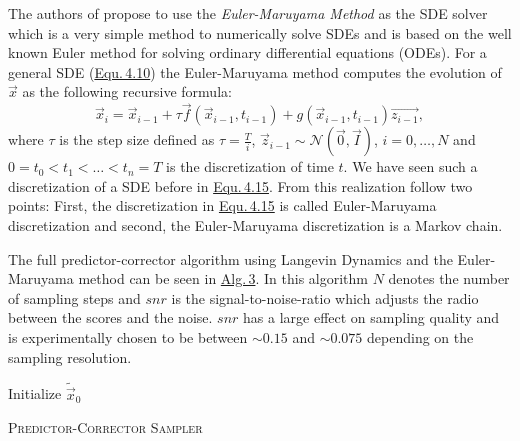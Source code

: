 The authors of \cite{score_3} propose to use the \textit{Euler-Maruyama Method} as the SDE solver which is a very simple method to numerically solve SDEs and is based on the well known Euler method for solving ordinary differential equations (ODEs). For a general SDE (\hyperref[equ:4.10]{Equ.\,4.10}) the Euler-Maruyama method computes the evolution of $\vec{x}$ as the following recursive formula:
%
\begin{equation} \label{equ:4.20}
    \vec{x}_i=\vec{x}_{i-1}+\tau\vec{f}(\vec{x}_{i-1}, t_{i-1})+g(\vec{x}_{i-1}, t_{i-1})\vec{z_{i-1}},
\end{equation}
%
where $\tau$ is the step size defined as $\tau=\frac{T}{i}$, $\vec{z}_{i-1}\sim\mathcal{N}(\vec{0},\vec{I})$, $i=0,\dots,N$ and $0=t_0<t_1<\dots<t_n=T$ is the discretization of time $t$. We have seen such a discretization of a SDE before in \hyperref[equ:4.15]{Equ.\,4.15}. From this realization follow two points: First, the discretization in \hyperref[equ:4.15]{Equ.\,4.15} is called Euler-Maruyama discretization and second, the Euler-Maruyama discretization is a Markov chain.

The full predictor-corrector algorithm using Langevin Dynamics and the Euler-Maruyama method can be seen in \hyperref[alg:3]{Alg.\,3}. In this algorithm $N$ denotes the number of sampling steps and $snr$ is the signal-to-noise-ratio which adjusts the radio between the scores and the noise. $snr$ has a large effect on sampling quality and is experimentally chosen to be between $\sim0.15$ and $\sim0.075$ depending on the sampling resolution. 
%
\begin{algorithm} \label{alg:3}
    \DontPrintSemicolon
    Initialize $\tilde{\vec{x}}_0$\;

    
    \caption[Predictor-Corrector Sampler]{\textsc{Predictor-Corrector Sampler}}
\end{algorithm}
%

